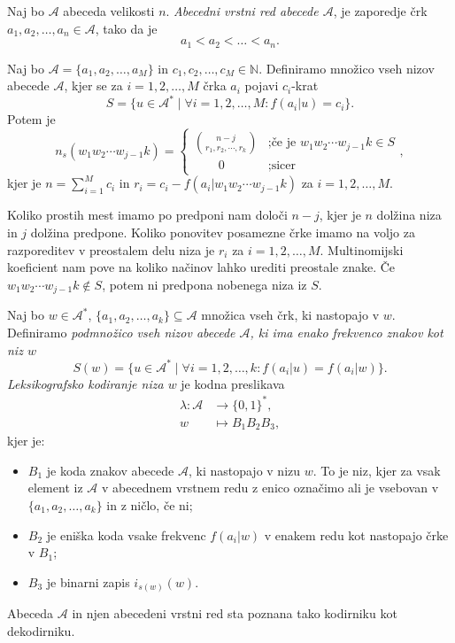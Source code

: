 \documentclass[fin1, tisk]{fmfdelo}
\newcommand{\N}{\mathbb{N}}
\newcommand{\A}{\mathcal{A}}
\theoremstyle{definition}
\begin{document}
\begin{definicija}
    Naj bo $\A$ abeceda velikosti $n$. \emph{Abecedni vrstni red abecede $\A$}, je 
    zaporedje črk $a_1, a_2, \ldots, a_n \in \A$, tako da je
    \[
        a_1 < a_2 < \ldots < a_n.
    \]
\end{definicija}

\begin{trditev}
    Naj bo $\A = \{a_1, a_2, \ldots, a_M \}$ in $c_1, c_2, \ldots, c_M \in \N$.
    Definiramo množico vseh nizov abecede $\A$, kjer se za $i = 1, 2, \ldots, M$ črka
    $a_i$ pojavi $c_i$-krat
    \[
        S = \bigl\{ u \in \A^* \mid \forall i= 1, 2, \ldots, M \colon f(a_i|u) = c_i \bigr\}.
    \]
    Potem je
    \[
        n_s(w_1w_2 \cdots w_{j-1}k) = 
        \begin{cases}
            \binom{n-j}{r_1, r_2, \cdots, r_k} & \text{;če je } w_1w_2 \cdots w_{j-1}k \in S\\
            \qquad 0 & \text{;sicer}
        \end{cases},
    \]
    kjer je $n = \sum_{i=1}^M c_i$ in $r_i = c_i - f(a_i|w_1w_2 \cdots w_{j-1}k)$ za 
    $i = 1, 2, \ldots, M$.
\end{trditev}

\begin{dokaz}
    Koliko prostih mest imamo po predponi nam določi $n-j$, kjer je $n$ dolžina niza
    in $j$ dolžina predpone. Koliko ponovitev posamezne črke imamo na voljo za razporeditev v
    preostalem delu niza je $r_i$ za $i=1,2, \ldots, M$. Multinomijski koeficient nam pove na koliko
    načinov lahko urediti preostale znake. Če $w_1w_2 \cdots w_{j-1}k \notin S$, potem ni predpona
    nobenega niza iz $S$.
\end{dokaz}

\begin{definicija}\label{def:LeksikografskoKodiranje}
    Naj bo $w \in \A^*$, $\{a_1, a_2, \ldots, a_k \} \subseteq \A$ množica vseh črk, ki 
    nastopajo v $w$. Definiramo \emph{podmnožico vseh nizov abecede $\A$, ki ima enako
    frekvenco znakov kot niz $w$}
    \[
        S(w) = \bigl\{ u \in \A^* \mid \forall i= 1, 2, \ldots, k \colon f(a_i|u) = f(a_i|w) \bigr\}.
    \]
    \emph{Leksikografsko kodiranje niza $w$} je kodna preslikava
    \begin{align*}
        \lambda  \colon \A &\to \{ 0, 1\}^*, \\
        w &\mapsto B_1B_2B_3,
    \end{align*}
    kjer je:
    \begin{itemize}
        \item $B_1$ je koda znakov abecede $\A$, ki nastopajo v nizu $w$. To je niz, kjer
        za vsak element iz $\A$ v abecednem vrstnem redu z enico označimo ali je vsebovan
        v $\{a_1, a_2, \ldots, a_k \}$ in z ničlo, če ni;
        \item $B_2$ je eniška koda vsake frekvenc $f(a_i|w)$ v enakem redu kot nastopajo črke v $B_1$;
        \item $B_3$ je binarni zapis $i_{s(w)}(w)$.
    \end{itemize}
    Abeceda $\A$ in njen abecedeni vrstni red sta poznana tako kodirniku kot dekodirniku.
\end{definicija}
\end{document}
